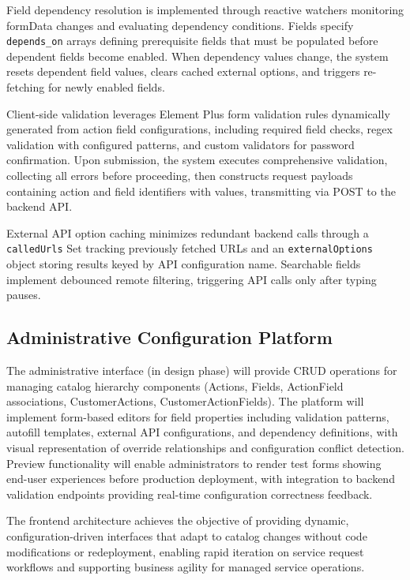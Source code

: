 Field dependency resolution is implemented through reactive watchers monitoring formData changes and evaluating dependency conditions. Fields specify \texttt{depends\_on} arrays defining prerequisite fields that must be populated before dependent fields become enabled. When dependency values change, the system resets dependent field values, clears cached external options, and triggers re-fetching for newly enabled fields.

Client-side validation leverages Element Plus form validation rules dynamically generated from action field configurations, including required field checks, regex validation with configured patterns, and custom validators for password confirmation. Upon submission, the system executes comprehensive validation, collecting all errors before proceeding, then constructs request payloads containing action and field identifiers with values, transmitting via POST to the backend API.

External API option caching minimizes redundant backend calls through a \texttt{calledUrls} Set tracking previously fetched URLs and an \texttt{externalOptions} object storing results keyed by API configuration name. Searchable fields implement debounced remote filtering, triggering API calls only after typing pauses.

\subsection{Administrative Configuration Platform}

The administrative interface (in design phase) will provide CRUD operations for managing catalog hierarchy components (Actions, Fields, ActionField associations, CustomerActions, CustomerActionFields). The platform will implement form-based editors for field properties including validation patterns, autofill templates, external API configurations, and dependency definitions, with visual representation of override relationships and configuration conflict detection. Preview functionality will enable administrators to render test forms showing end-user experiences before production deployment, with integration to backend validation endpoints providing real-time configuration correctness feedback.

The frontend architecture achieves the objective of providing dynamic, configuration-driven interfaces that adapt to catalog changes without code modifications or redeployment, enabling rapid iteration on service request workflows and supporting business agility for managed service operations.